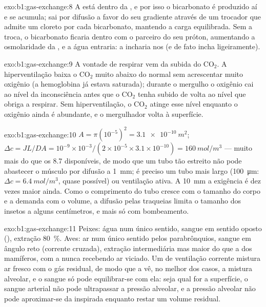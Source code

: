 \begin{solution}{exo:b1:gas-exchange:8}
A  está dentro da , e por isso o bicarbonato é
produzido aí e se acumula; sai por difusão a favor do seu gradiente
através de um trocador que admite um cloreto por cada bicarbonato,
mantendo a carga equilibrada. Sem a troca, o bicarbonato ficaria
dentro com o parceiro do seu próton, aumentando a osmolaridade da
, e a água entraria: a  incharia nos  (e de fato
incha ligeiramente).
\end{solution}

\begin{solution}{exo:b1:gas-exchange:9}
A vontade de respirar vem da subida do $\mathrm{CO_2}$. A
hiperventilação baixa o $\mathrm{CO_2}$ muito abaixo do normal sem
acrescentar muito oxigênio (a hemoglobina já estava saturada); durante
o mergulho o oxigênio cai ao nível da inconsciência antes que o
$\mathrm{CO_2}$ tenha subido de volta ao nível que obriga a respirar.
Sem hiperventilação, o $\mathrm{CO_2}$ atinge esse nível enquanto o
oxigênio ainda é abundante, e o mergulhador volta à superfície.
\end{solution}

\begin{solution}{exo:b1:gas-exchange:10}
$A = \pi(10^{-5})^2 = \qty{3.1e-10}{m^2}$; $\Delta c = JL/DA =
10^{-9}\times 10^{-3}/(2\times 10^{-5}\times 3.1\times 10^{-10}) =
\qty{160}{mol/m^3}$ --- muito mais do que os \qty{8.7}{} disponíveis,
de modo que um tubo tão estreito não pode abastecer o músculo por
difusão a \qty{1}{mm}; é preciso um tubo mais largo
(\qty{100}{\micro m}: $\Delta c = \qty{6.4}{mol/m^3}$, quase possível)
ou ventilação ativa. A \qty{10}{mm} a exigência é dez vezes maior
ainda. Como o comprimento do tubo cresce com o tamanho do corpo e a
demanda com o volume, a difusão pelas traqueias limita o tamanho dos
insetos a alguns centímetros, e mais só com bombeamento.
\end{solution}

\begin{solution}{exo:b1:gas-exchange:11}
Peixes: água num único sentido, sangue em sentido oposto
(), extração \qty{80}{\%}. Aves: ar num único sentido
pelos parabrônquios, sangue em ângulo reto (corrente cruzada),
extração intermediária mas maior do que a dos mamíferos, com a
 nunca recebendo ar viciado. Um  de
ventilação corrente mistura ar fresco com o gás residual, de modo que
a  vê, no melhor dos casos, a mistura alveolar, e o
sangue só pode equilibrar-se com ela: seja qual for a superfície, o
sangue arterial não pode ultrapassar a pressão alveolar, e a pressão
alveolar não pode aproximar-se da inspirada enquanto restar um volume
residual.
\end{solution}

